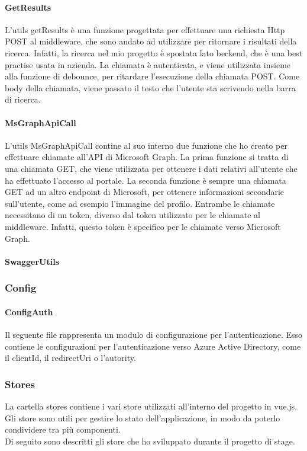 \paragraph{GetResults}\label{par:get-results}
L'utils getResults è una funzione progettata per effettuare una richiesta Http POST al middleware, che sono andato ad utilizzare per ritornare 
i risultati della ricerca. Infatti, la ricerca nel mio progetto è spostata lato beckend, che è una best practise usata in azienda.
La chiamata è autenticata, e viene utilizzata insieme alla funzione di debounce, per ritardare l'esecuzione della chiamata POST. Come body della chiamata,
viene passato il testo che l'utente sta scrivendo nella barra di ricerca.

\paragraph{MsGraphApiCall}\label{par:ms-graph-api-call}
L'utils MsGraphApiCall contine al suo interno due funzione che ho creato per effettuare chiamate all'API di Microsoft Graph. 
La prima funzione si tratta di una chiamata GET, che viene utilizzata per ottenere i dati relativi all'utente che ha effettuato l'accesso al portale.
La seconda funzione è sempre una chiamata GET ad un altro endpoint di Microsoft, per ottenere informazioni secondarie sull'utente, come ad esempio l'immagine del profilo.
Entrambe le chiamate necessitano di un token, diverso dal token utilizzato per le chiamate al middleware. Infatti, questo token è specifico per le chiamate verso Microsoft Graph.

\paragraph{SwaggerUtils}\label{par:swagger-utils}


\subsubsection{Config}\label{subsubsec:config}
\paragraph{ConfigAuth}\label{par:config-auth}
Il seguente file rappresenta un modulo di configurazione per l'autenticazione. Esso contiene le configurazioni per l'autenticazione verso Azure Active Directory,
come il clientId, il redirectUri o l'autority.  

\subsubsection{Stores}\label{subsubsec:store}
La cartella stores contiene i vari store utilizzati all'interno del progetto in vue.js. Gli store sono utili per gestire lo stato dell'applicazione,
in modo da poterlo condividere tra più componenti.\\
Di seguito sono descritti gli store che ho sviluppato durante il progetto di stage.

